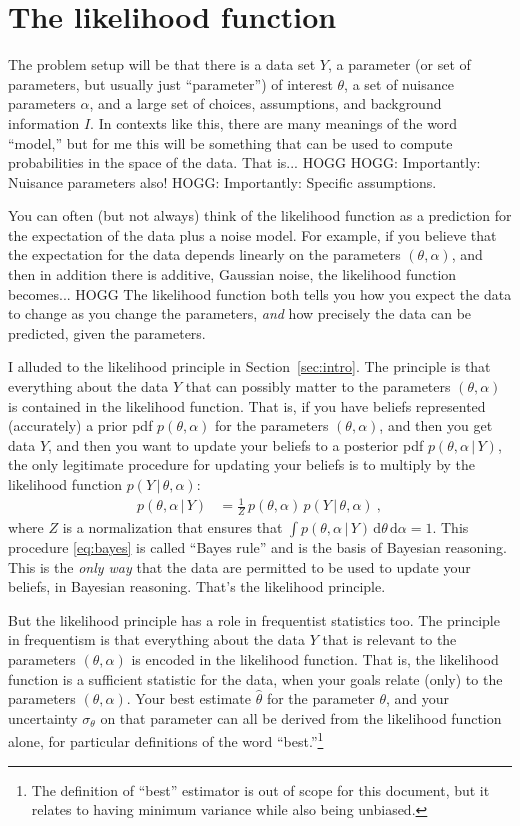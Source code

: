 \documentclass{article}
\newcommand{\sectionname}{Section}
\newcommand{\secref}[1]{\sectionname~\ref{#1}}
\newcommand{\dd}{\mathrm{d}}
\newcommand{\given}{\,|\,}
\begin{document}
\section{The likelihood function}\label{sec:lf}
The problem setup will be that there is a data set $Y$, a parameter (or set of parameters, but usually just ``parameter'') of interest $\theta$, a set of nuisance parameters $\alpha$, and a large set of choices, assumptions, and background information $I$.
In contexts like this, there are many meanings of the word ``model,'' but for me this will be something that can be used to compute probabilities in the space of the data.
That is... HOGG
HOGG: Importantly: Nuisance parameters also!
HOGG: Importantly: Specific assumptions.

You can often (but not always) think of the likelihood function as a prediction for the expectation of the data plus a noise model.
For example, if you believe that the expectation for the data depends linearly on the parameters $(\theta, \alpha)$, and then in addition there is additive, Gaussian noise, the likelihood function becomes... HOGG
The likelihood function both tells you how you expect the data to change as you change the parameters, \emph{and} how precisely the data can be predicted, given the parameters.

I alluded to the likelihood principle in \secref{sec:intro}.
The principle is that everything about the data $Y$ that can possibly matter to the parameters $(\theta,\alpha)$ is contained in the likelihood function.
That is, if you have beliefs represented (accurately) a prior pdf $p(\theta,\alpha)$ for the parameters $(\theta,\alpha)$,
and then you get data $Y$,
and then you want to update your beliefs to a posterior pdf $p(\theta,\alpha\given Y)$, the only legitimate procedure for updating your beliefs is to multiply by the likelihood function $p(Y\given\theta,\alpha)$:
\begin{align}
    p(\theta,\alpha\given Y) &= \frac{1}{Z}\,p(\theta,\alpha)\,p(Y\given\theta,\alpha) ~,\label{eq:bayes}
\end{align}
where $Z$ is a normalization that ensures that $\int p(\theta,\alpha\given Y)\,\dd\theta\,\dd\alpha=1$.
This procedure \eqref{eq:bayes} is called ``Bayes rule'' and is the basis of Bayesian reasoning.
This is the \emph{only way} that the data are permitted to be used to update your beliefs, in Bayesian reasoning.
That's the likelihood principle.

But the likelihood principle has a role in frequentist statistics too.
The principle in frequentism is that everything about the data $Y$ that is relevant to the parameters $(\theta,\alpha)$ is encoded in the likelihood function.
That is, the likelihood function is a sufficient statistic for the data, when your goals relate (only) to the parameters $(\theta,\alpha)$.
Your best estimate $\hat{\theta}$ for the parameter $\theta$, and your uncertainty $\sigma_\theta$ on that parameter can all be derived from the likelihood function alone, for particular definitions of the word ``best.''\footnote{%
The definition of ``best'' estimator is out of scope for this document, but it relates to having minimum variance while also being unbiased.}
\end{document}
